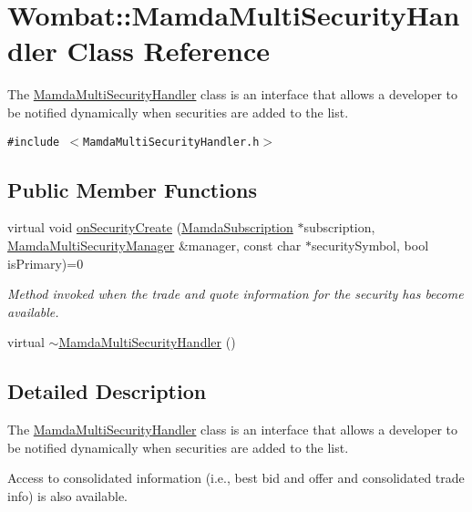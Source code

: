 \hypertarget{classWombat_1_1MamdaMultiSecurityHandler}{
\section{Wombat::Mamda\-Multi\-Security\-Handler Class Reference}
\label{classWombat_1_1MamdaMultiSecurityHandler}
}
The \hyperlink{classWombat_1_1MamdaMultiSecurityHandler}{Mamda\-Multi\-Security\-Handler} class is an interface that allows a developer to be notified dynamically when securities are added to the list.  


{\tt \#include $<$Mamda\-Multi\-Security\-Handler.h$>$}

\subsection*{Public Member Functions}
\begin{CompactItemize}
\item 
virtual void \hyperlink{classWombat_1_1MamdaMultiSecurityHandler_e9facdb0af49b6cf3974c16f0ae2f0df}{on\-Security\-Create} (\hyperlink{classWombat_1_1MamdaSubscription}{Mamda\-Subscription} $\ast$subscription, \hyperlink{classWombat_1_1MamdaMultiSecurityManager}{Mamda\-Multi\-Security\-Manager} \&manager, const char $\ast$security\-Symbol, bool is\-Primary)=0
\begin{CompactList}\small\item\em Method invoked when the trade and quote information for the security has become available. \item\end{CompactList}\item 
virtual \hyperlink{classWombat_1_1MamdaMultiSecurityHandler_a049866a536c746797401f3d41380cf1}{$\sim$Mamda\-Multi\-Security\-Handler} ()
\end{CompactItemize}


\subsection{Detailed Description}
The \hyperlink{classWombat_1_1MamdaMultiSecurityHandler}{Mamda\-Multi\-Security\-Handler} class is an interface that allows a developer to be notified dynamically when securities are added to the list. 

Access to consolidated information (i.e., best bid and offer and consolidated trade info) is also available. 



